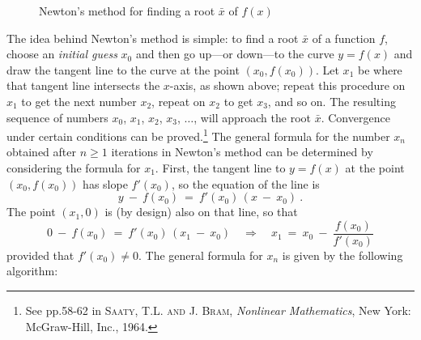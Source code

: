 \begin{figure}[ht]
 \centering
 \caption[]{\quad Newton's method for finding a root $\bar{x}$ of $f(x)$}
 \label{fig:newton}
\end{figure}

\noindent The idea behind Newton's method is simple: to find a root $\bar{x}$ of
a function $f$, choose an \emph{initial guess} $x_0$ and then go up---or
down---to the curve $y=f(x)$ and draw the tangent line to the curve at the
point $(x_0,f(x_0))$. Let $x_1$ be where that tangent line intersects the
$x$-axis, as shown above; repeat this procedure on $x_1$ to get the next number
$x_2$, repeat on $x_2$ to get $x_3$, and so on. The resulting sequence of
numbers $x_0$, $x_1$, $x_2$, $x_3$, $\ldots$, will approach the root $\bar{x}$.
Convergence under certain conditions can be proved.\footnote{See pp.58-62 in
\textsc{Saaty, T.L. and J. Bram}, \emph{Nonlinear Mathematics}, New York:
McGraw-Hill, Inc., 1964.}
\newpage
The general formula for the number $x_n$ obtained after $n \ge 1$ iterations in
Newton's method can be determined by considering the formula for $x_1$. First,
the tangent line to $y=f(x)$ at the point $(x_0,f(x_0))$ has slope $f'(x_0)$, so
the equation of the line is
\begin{equation}\label{eqn:newton}
y ~-~ f(x_0) ~=~ f'(x_0)\,(x ~-~ x_0) ~.
\end{equation}
 The point $(x_1,0)$ is (by design) also on that line, so that
\[
0 ~-~ f(x_0) ~=~ f'(x_0)\,(x_1 ~-~ x_0) \quad\Rightarrow\quad
x_1 ~=~ x_0 ~-~ \frac{f(x_0)}{f'(x_0)}
\]
provided that $f'(x_0) \ne 0$. The general formula for $x_n$ is given by the
following algorithm:

